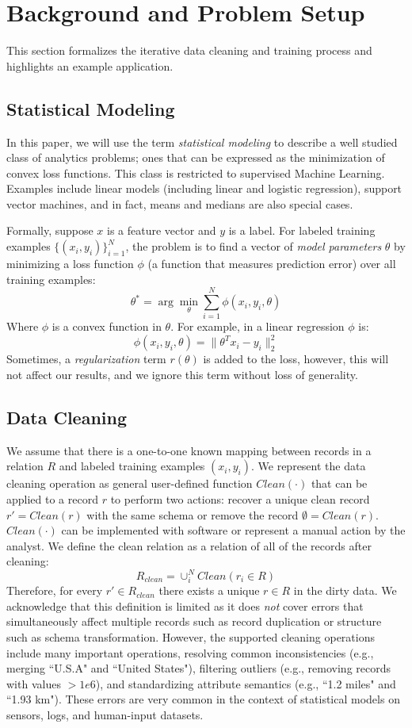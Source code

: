 \section{Background and Problem Setup}\label{background}
This section formalizes the iterative data cleaning and training process and highlights an example application.

\subsection{Statistical Modeling}
In this paper, we will use the term \emph{statistical modeling} to describe a well studied class of analytics problems; ones that can be expressed as the minimization of convex loss functions.
This class is restricted to supervised Machine Learning.
Examples include linear models (including linear and logistic regression), support vector machines, and in fact, means and medians are also special cases. 

Formally, suppose $x$ is a feature vector and $y$ is a label.
For labeled training examples $\{(x_{i},y_{i})\}_{i=1}^{N}$, the problem is to find a vector of \emph{model parameters} $\theta$ by minimizing a loss function $\phi$ (a function that measures prediction error) over all training examples:
\[
 \theta^{*}=\arg\min_{\theta}\sum_{i=1}^{N}\phi(x_{i},y_{i},\theta)
\]
Where $\phi$ is a convex function in $\theta$.
For example, in a linear regression $\phi$ is:
\[
\phi(x_{i},y_{i},\theta) = \|\theta^Tx_{i} - y_i \|_2^2
\]
Sometimes, a \emph{regularization} term $r(\theta)$ is added to the loss, however, this will not affect our results, and we ignore this term without loss of generality.

\subsection{Data Cleaning}
We assume that there is a one-to-one known mapping between records in a relation $R$ and labeled training examples $(x_{i},y_{i})$.
We represent the data cleaning operation as general user-defined function $Clean(\cdot)$ that can be applied to a record $r$ to perform two actions: recover a unique clean record $r' = Clean(r)$ with the same schema or remove the record $\emptyset = Clean(r)$.
$Clean(\cdot)$ can be implemented with software or represent a manual action by the analyst.
We define the clean relation as a relation of all of the records after cleaning:
\[R_{clean} = \cup_i^N Clean(r_i \in R)\]
Therefore, for every $r' \in R_{clean}$ there exists a unique $r \in R$ in the dirty data.
We acknowledge that this definition is limited as it does \emph{not} cover errors that simultaneously affect multiple records such as record duplication or structure such as schema transformation.
However, the supported cleaning operations include many important operations, resolving common inconsistencies (e.g., merging ``U.S.A" and ``United States"), filtering outliers (e.g., removing records with values $>1e6$), and standardizing attribute semantics (e.g., ``1.2 miles" and ``1.93 km").
These errors are very common in the context of statistical models on sensors, logs, and human-input datasets. 

